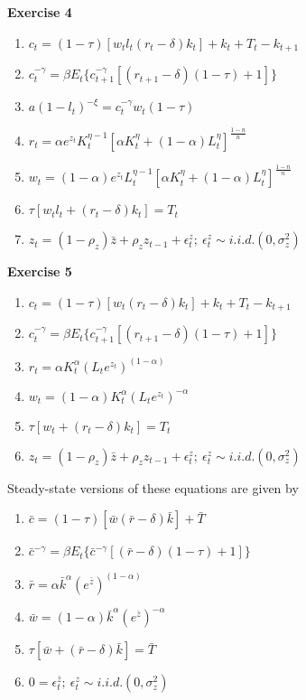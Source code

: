 \documentclass[letterpaper,12pt]{article}
\begin{document}
\textbf{Exercise 4}

\begin{enumerate}
	\item $c_t = (1 - \tau)[w_t l_t (r_t - \delta) k_t] + k_t + T_t - k_{t+1}$
	\item $c_t^{-\gamma} = \beta E_t \{c_{t+1}^{-\gamma} [(r_{t+1} - \delta)(1 - \tau) + 1]\}$
	\item $a (1 - l_t)^{-\xi} = c_t^{-\gamma} w_t (1 - \tau)$
	\item $r_t = \alpha e^{z_t} K_t^{\eta - 1} [\alpha K_t^\eta + (1 - \alpha) L_t^\eta]^{\frac{1-n}{n}}$
	\item $w_t = (1 - \alpha) e^{z_t} L_t^{\eta - 1}[\alpha K_t^\eta + (1 - \alpha)L_t^\eta]^{\frac{1-n}{n}}$
	\item $\tau[w_t l_t + (r_t - \delta) k_t] = T_t$
	\item $z_t = (1 - \rho_z) \bar{z} + \rho_z z_{t-1} + \epsilon_t^z; \ \epsilon_t^z \sim i.i.d.(0, \sigma_z^2)$
\end{enumerate}

\textbf{Exercise 5}

\begin{enumerate}
	\item $c_t = (1 - \tau)[w_t (r_t - \delta) k_t] + k_t + T_t - k_{t+1}$
	\item $c_t^{-\gamma} = \beta E_t \{c_{t+1}^{-\gamma} [(r_{t+1} - \delta)(1 - \tau) + 1]\}$
	\item $r_t = \alpha K_t^\alpha (L_t e^{z_t})^{(1 - \alpha)}$
	\item $w_t = (1 - \alpha) K_t^\alpha (L_t e^{z_t}) ^{-\alpha}$
	\item $\tau[w_t + (r_t - \delta) k_t] = T_t$
	\item $z_t = (1 - \rho_z) \bar{z} + \rho_z z_{t-1} + \epsilon_t^z; \ \epsilon_t^z \sim i.i.d.(0, \sigma_z^2)$
\end{enumerate}

Steady-state versions of these equations are given by
\begin{enumerate}
	\item $\bar{c} = (1 - \tau)[\bar{w} (\bar{r} - \delta) \bar{k}]  + \bar{T} $
	\item $\bar{c}^{-\gamma} = \beta E_t \{\bar{c}^{-\gamma} [(\bar{r} - \delta)(1 - \tau) + 1]\}$
	\item $\bar{r} = \alpha \bar{k}^\alpha (e^{\bar{z}})^{(1 - \alpha)}$
	\item $\bar{w} = (1 - \alpha) \bar{k}^\alpha (e^{\bar{z}}) ^{-\alpha}$
	\item $\tau[\bar{w} + (\bar{r} - \delta) \bar{k}] = \bar{T}$
	\item $0 = \epsilon_t^{\bar{z}}; \ \epsilon_t^z \sim i.i.d.(0, \sigma_z^2)$
\end{enumerate}
\end{document}
